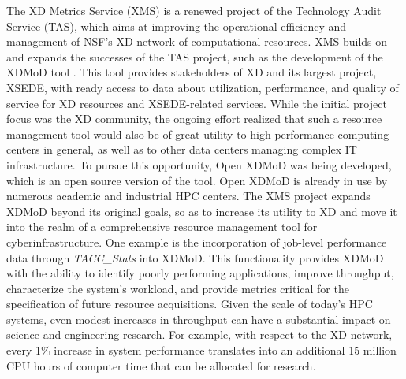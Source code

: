 The XD Metrics Service (XMS) \cite{hid-sample-vonLaszewski15tas} is a
renewed project of the Technology Audit Service (TAS), which aims at
improving the operational efficiency and management of NSF's XD
network of computational resources. XMS builds on and expands the
successes of the TAS project, such as the development of the XDMoD
tool . This tool provides stakeholders of XD and its
largest project, XSEDE, with ready access to data about utilization,
performance, and quality of service for XD resources and XSEDE-related
services. While the initial project focus was the XD community, the
ongoing effort realized that such a resource management tool would
also be of great utility to high performance computing centers in
general, as well as to other data centers managing complex IT
infrastructure. To pursue this opportunity, Open XDMoD was being
developed, which is an open source version of the tool. Open XDMoD is
already in use by numerous academic and industrial HPC centers. The
XMS project expands XDMoD beyond its original goals, so as to increase
its utility to XD and move it into the realm of a comprehensive
resource management tool for cyberinfrastructure. One example is the
incorporation of job-level performance data through
\textit{TACC\_Stats} into XDMoD. This functionality
provides XDMoD with the ability to identify poorly performing
applications, improve throughput, characterize the system's workload,
and provide metrics critical for the specification of future resource
acquisitions. Given the scale of today's HPC systems, even modest
increases in throughput can have a substantial impact on science and
engineering research. For example, with respect to the XD network,
every 1\% increase in system performance translates into an additional
15 million CPU hours of computer time that can be allocated for
research.






